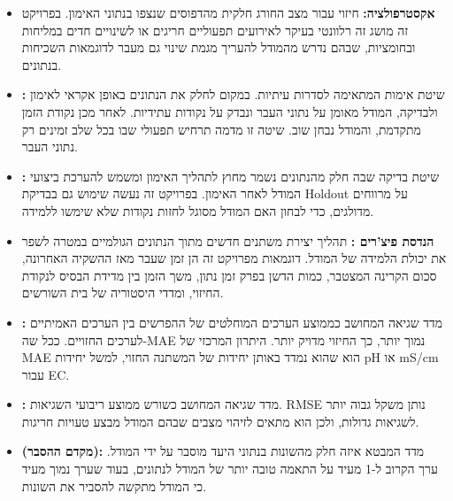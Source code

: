 \begin{itemize}
\item \textbf{\color{ruppinblue}אקסטרפולציה:} חיזוי עבור מצב החורג חלקית מהדפוסים שנצפו בנתוני האימון. בפרויקט זה מושג זה רלוונטי בעיקר לאירועים תפעוליים חריגים או לשינויים חדים במליחות ובחומציות, שבהם נדרש מהמודל להעריך מגמת שינוי גם מעבר לדוגמאות השכיחות בנתונים.

\item \textbf{\color{ruppinblue}\WFV{}:} שיטת אימות המתאימה לסדרות עיתיות. במקום לחלק את הנתונים באופן אקראי לאימון ולבדיקה, המודל מאומן על נתוני העבר ונבדק על נקודות עתידיות. לאחר מכן נקודת הזמן מתקדמת, והמודל נבחן שוב. שיטה זו מדמה תרחיש תפעולי שבו בכל שלב זמינים רק נתוני העבר.

\item \textbf{\color{ruppinblue}:} שיטת בדיקה שבה חלק מהנתונים נשמר מחוץ לתהליך האימון ומשמש להערכת ביצועי המודל לאחר האימון. בפרויקט זה נעשה שימוש גם בבדיקת Holdout על מרווחים מדולגים, כדי לבחון האם המודל מסוגל לחזות נקודות שלא שימשו ללמידה.

\item \textbf{\color{ruppinblue}הנדסת פיצ'רים :} תהליך יצירת משתנים חדשים מתוך הנתונים הגולמיים במטרה לשפר את יכולת הלמידה של המודל. דוגמאות מפרויקט זה הן זמן שעבר מאז ההשקיה האחרונה, סכום הקרינה המצטבר, כמות הדשן בפרק זמן נתון, משך הזמן בין מדידת הבסיס לנקודת החיזוי, ומדדי היסטוריה של בית השורשים.

\item \textbf{\color{ruppinblue}:} מדד שגיאה המחושב כממוצע הערכים המוחלטים של ההפרשים בין הערכים האמיתיים לערכים החזויים. ככל שה-MAE נמוך יותר, כך החיזוי מדויק יותר. היתרון המרכזי של MAE הוא שהוא נמדד באותן יחידות של המשתנה החזוי, למשל יחידות pH או mS/cm עבור EC.

\item \textbf{\color{ruppinblue}:} מדד שגיאה המחושב כשורש ממוצע ריבועי השגיאות. RMSE נותן משקל גבוה יותר לשגיאות גדולות, ולכן הוא מתאים לזיהוי מצבים שבהם המודל מבצע טעויות חריגות.

\item \textbf{\color{ruppinblue}\Rtwo{} (מקדם ההסבר):} מדד המבטא איזה חלק מהשונות בנתוני היעד מוסבר על ידי המודל. ערך הקרוב ל-1 מעיד על התאמה טובה יותר של המודל לנתונים, בעוד שערך נמוך מעיד כי המודל מתקשה להסביר את השונות.
\end{itemize}
